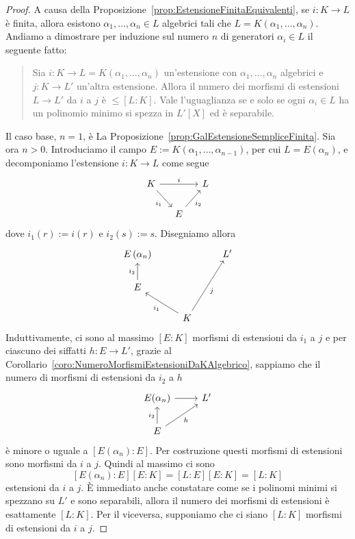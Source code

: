 \begin{proof}
A causa della Proposizione~\ref{prop:EstensioneFinitaEquivalenti}, se \(i : K \to L\) è finita, allora esistono \(\alpha_1, \dots{}, \alpha_n \in L\) algebrici tali che \(L = K\left(\alpha_1, \dots{}, \alpha_n\right)\). Andiamo a dimostrare per induzione sul numero \(n\) di generatori \(\alpha_i \in L\) il seguente fatto:
\begin{quotation}
Sia \(i : K \to L = K\left(\alpha_1, \dots{}, \alpha_n\right)\) un'estensione con \(\alpha_1, \dots{}, \alpha_n\) algebrici e \(j : K \to L'\) un'altra estensione. Allora il numero dei morfismi di estensioni \(L \to L'\) da \(i\) a \(j\) è \(\le [L:K]\). Vale l'uguaglianza se e solo se ogni \(\alpha_i \in L\) ha un polinomio minimo si spezza in \(L'[X]\) ed è separabile.
\end{quotation}
Il caso base, \(n=1\), è La Proposizione~\ref{prop:GalEstensioneSempliceFinita}. Sia ora \(n > 0\). Introduciamo il campo \(E := K\left(\alpha_1, \dots{}, \alpha_{n-1}\right)\), per cui \(L = E(\alpha_n)\), e decomponiamo l'estensione \(i : K \to L\) come segue
\[\begin{tikzcd}[column sep=small]
K \ar["i", rr] \ar["{i_1}", dr, swap] & & L \\
& E \ar["{i_2}", ur, swap]
\end{tikzcd}\]
dove \(i_1(r) := i(r)\) e \(i_2(s) := s\). Disegniamo allora
\[\begin{tikzcd}
E\left(\alpha_n\right) & & L' \\
E \ar["{i_2}", u] \\
& K \ar["{i_1}", ul] \ar["j", uur, swap]
\end{tikzcd}\]
Induttivamente, ci sono al massimo \([E:K]\) morfismi di estensioni da \(i_1\) a \(j\) e per ciascuno dei siffatti \(h : E \to L'\), grazie al Corollario~\ref{coro:NumeroMorfismiEstensioniDaKAlgebrico}, sappiamo che il numero di morfismi di estensioni da \(i_2\) a \(h\)
\[\begin{tikzcd}
E(\alpha_n) \ar[r] & L' \\
E \ar["{i_2}", u] \ar["h", ur, swap]
\end{tikzcd}\]
è minore o uguale a \(\left[E\left(\alpha_n\right):E\right]\). Per costruzione questi morfismi di estensioni sono morfismi da \(i\) a \(j\). Quindi al massimo ci sono
\[[E(\alpha_n):E][E:K] = [L:E][E:K] = [L:K]\]
estensioni da \(i\) a \(j\). È immediato anche constatare come se i polinomi minimi si spezzano su \(L'\) e sono separabili, allora il numero dei morfismi di estensioni è esattamente \([L:K]\). Per il viceversa, supponiamo che ci siano \([L:K]\) morfismi di estensioni da \(i\) a \(j\). 
\end{proof}

